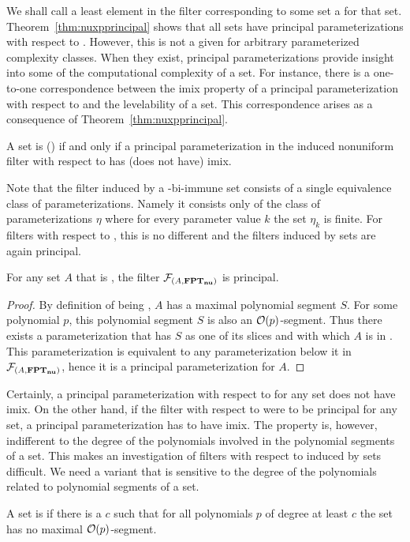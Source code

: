 We shall call a least element in the filter corresponding to some set a  for that set.
Theorem~\ref{thm:nuxpprincipal} shows that all sets have principal parameterizations with respect to .
However, this is not a given for arbitrary parameterized complexity classes.
When they exist, principal parameterizations provide insight into some of the computational complexity of a set.
For instance, there is a one-to-one correspondence between the imix property of a principal parameterization with respect to  and the levelability of a set.
This correspondence arises as a consequence of Theorem~\ref{thm:nuxpprincipal}.
\begin{corollary}
  A set is  () if and only if a principal parameterization in the induced nonuniform filter with respect to  has (does not have) imix.
\end{corollary}

Note that the filter induced by a -bi-immune set consists of a single equivalence class of parameterizations.
Namely it consists only of the class of parameterizations $\eta$ where for every parameter value $k$ the set $\eta_k$ is finite.
For filters with respect to , this is no different and the filters induced by  sets are again principal.
\begin{theorem}
\label{thm:nufptprincipal}
  For any set $A$ that is , the filter $\mathcal{F}_{(A, \textnormal{\textbf{FPT$_\textbf{nu}$}})}$ is principal.
\end{theorem}
\begin{proof}
  By definition of being , $A$ has a maximal polynomial segment $S$.
  For some polynomial $p$, this polynomial segment $S$ is also an $\operatorname{\mathcal{O}}(p)$-segment.
  Thus there exists a parameterization that has $S$ as one of its slices and with which $A$ is in .
  This parameterization is equivalent to any parameterization below it in $\mathcal{F}_{(A, \textnormal{\textbf{FPT$_\textbf{nu}$}})}$, hence it is a principal parameterization for $A$.
\end{proof}

Certainly, a principal parameterization with respect to  for any  set does not have imix.
On the other hand, if the filter with respect to  were to be principal for any  set, a principal parameterization has to have imix.
The  property is, however, indifferent to the degree of the polynomials involved in the polynomial segments of a set.
This makes an investigation of filters with respect to  induced by  sets difficult.
We need a variant that is sensitive to the degree of the polynomials related to polynomial segments of a set.
\begin{definition}
  A set is  if there is a $c$ such that for all polynomials $p$ of degree at least $c$ the set has no maximal $\operatorname{\mathcal{O}}(p)$-segment.
\end{definition}

